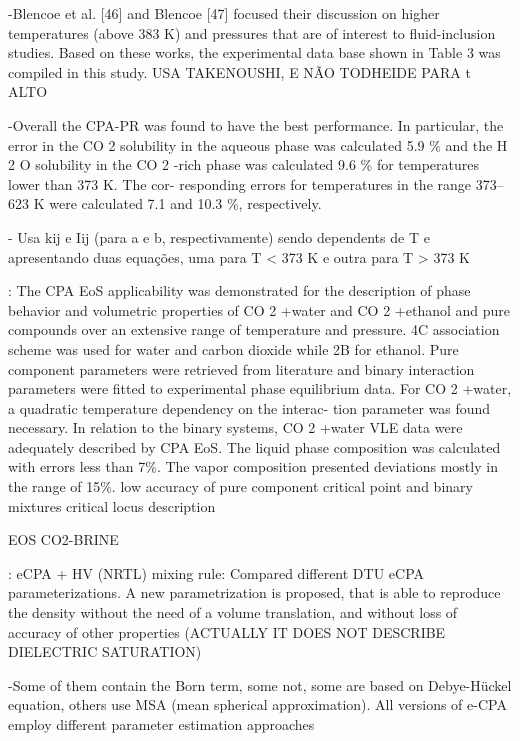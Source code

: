 -Blencoe et al. [46] and Blencoe [47] focused their discussion on higher temperatures (above 383 K) and pressures that are of interest to ﬂuid-inclusion studies. Based on these works, the experimental data base shown in Table 3 was compiled in this study. USA TAKENOUSHI, E NÃO TODHEIDE PARA t ALTO

-Overall the CPA-PR was found to have the best performance.
In particular, the error in the CO 2 solubility in the aqueous phase
was calculated 5.9 \% and the H 2 O solubility in the CO 2 -rich phase
was calculated 9.6 \% for temperatures lower than 373 K. The cor-
responding errors for temperatures in the range 373–623 K were
calculated 7.1 and 10.3 \%, respectively.

- Usa kij e Iij (para a e b, respectivamente) sendo dependents de T e apresentando duas equações, uma para T < 373 K e outra para T > 373 K



\cite{Monteiro2020}: The CPA EoS applicability was demonstrated for the description of phase behavior and volumetric properties of CO 2 +water and
CO 2 +ethanol and pure compounds over an extensive range of
temperature and pressure. 4C association scheme was used for
water and carbon dioxide while 2B for ethanol. Pure component
parameters were retrieved from literature and binary interaction
parameters were ﬁtted to experimental phase equilibrium data. For
CO 2 +water, a quadratic temperature dependency on the interac-
tion parameter was found necessary. In relation to the binary systems, CO 2 +water VLE data were adequately described by CPA EoS. The liquid phase composition was calculated with errors less than 7\%. The vapor composition
presented deviations mostly in the range of 15\%. low accuracy of pure component critical point and binary mixtures critical locus description





EOS CO2-BRINE


\cite{Olsen2021}:  eCPA + HV (NRTL) mixing rule: Compared different DTU eCPA parameterizations. A new parametrization is proposed, that is able to reproduce the density without the need of a volume translation, and without loss of accuracy of other properties (ACTUALLY IT DOES NOT DESCRIBE DIELECTRIC SATURATION)

-Some of them contain the Born term, some not, some are based on Debye-Hückel equation, others use MSA (mean spherical approximation). All versions of e-CPA employ different parameter estimation approaches

